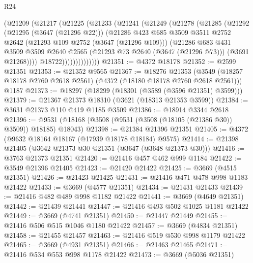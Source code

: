 \begin{lexlean}{R24}
\begin{coremodule}
                (@21209
                  (@21217
                    (@21225
                      (@21233
                        (@21241
                          (@21249
                            (@21278
                              (@21285
                                (@21292
                                  (@21295 (@3647 (@21296 @22)))
                                  (@21286
                                    @423
                                    @685
                                    @3509
                                    @3511
                                    @2752
                                    @2642
                                    (@21293 @109 @2752 (@3647 (@21296 @109)))
                                    (@21286
                                      @683
                                      @431
                                      @3509
                                      @3509
                                      @2640
                                      @2565
                                      (@21293 @73 @2640 (@3647 (@21296 @73)))
                                      (@3691 @21268))))
                                @18722))))))))))))))
@21351 := @4372 @18178
@21352 := @2599 @21351
@21353 := @21352 @9565
@21367 := @18276
    @21353
    (@3549 (@18257 @18178 @2760 @2618 @2561) (@4372 (@18180 @18178 @2760 @2618 @2561)))
    @1187
@21373 := @18297 (@18299 (@18301 (@3589 (@3596 @21351) @3599)))
@21379 := @21367 @21373 @18310 (@3621 (@18313 @21353 @3599))
@21384 := @3631 @21373 @110 @419 @1185 @3509
@21386 := @18914 @3344 @2618
@21396 := @9531 (@18168 (@3508 (@9531 (@3508 (@18105 (@21386 @30)) @3509)) @18185) @18043)
@21398 := @21384 @21396 @21351
@21405 := @4372 (@9632 @18164 @18167 (@17939 @18178 @18184) @9575)
@21414 := @21398 @21405 (@3642 @21373 @30 @21351 (@3647 (@3648 @21373 @30)))
@21416 := @3763 @21373 @21351
@21420 := @21416 @457 @462 @999 @1184
@21422 := @3549 @21396 @21405
@21423 := @21420 @21422
@21425 := @3669 (@4515 @21351)
@21426 := @21423 @21425
@21431 := @21416 @471 @478 @998 @1183 @21422
@21433 := @3669 (@4577 @21351)
@21434 := @21431 @21433
@21439 := @21416 @482 @489 @998 @1182 @21422
@21441 := @3669 (@4649 @21351)
@21442 := @21439 @21441
@21447 := @21416 @493 @502 @1025 @1181 @21422
@21449 := @3669 (@4741 @21351)
@21450 := @21447 @21449
@21455 := @21416 @506 @515 @1046 @1180 @21422
@21457 := @3669 (@4834 @21351)
@21458 := @21455 @21457
@21463 := @21416 @519 @530 @998 @1179 @21422
@21465 := @3669 (@4931 @21351)
@21466 := @21463 @21465
@21471 := @21416 @534 @553 @998 @1178 @21422
@21473 := @3669 (@5036 @21351)

\end{coremodule}
\end{lexlean}
